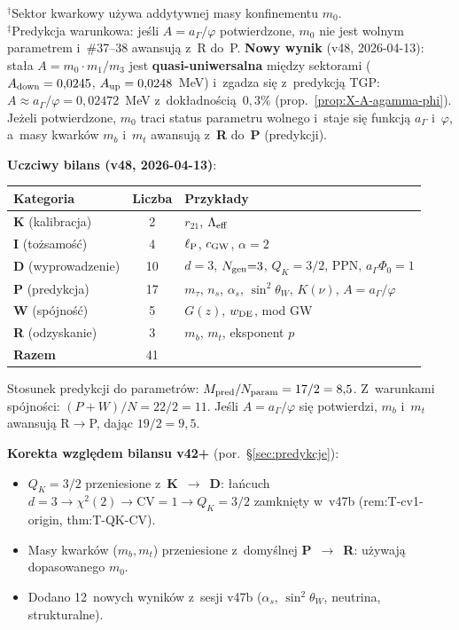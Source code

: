 \smallskip\noindent
$^\dagger$Sektor kwarkowy u\.zywa addytywnej masy konfinementu $m_0$.\\
$^\ddagger$Predykcja warunkowa: je\'sli $A = a_\Gamma/\varphi$ potwierdzone,
$m_0$ nie jest wolnym parametrem i~\#37--38 awansuj\k{a} z~R do~P.
\textbf{Nowy wynik} (v48, 2026-04-13): sta\l{}a $A = m_0 \cdot m_1/m_3$
jest \textbf{quasi-uniwersalna} mi\k{e}dzy sektorami
($A_{\rm down} = 0{,}0245$, $A_{\rm up} = 0{,}0248$~MeV)
i~zgadza si\k{e} z~predykcj\k{a} TGP: $A \approx a_\Gamma/\varphi = 0{,}02472$~MeV
z~dok\l{}adno\'sci\k{a}~$0{,}3\%$ (prop.~\ref{prop:X-A-agamma-phi}).
Je\.zeli potwierdzone, $m_0$ traci status parametru wolnego
i~staje si\k{e} funkcj\k{a} $a_\Gamma$ i~$\varphi$,
a~masy kwark\'ow $m_b$ i~$m_t$ awansuj\k{a} z~\textbf{R}
do~\textbf{P} (predykcji).

\medskip\noindent
\textbf{Uczciwy bilans (v48, 2026-04-13)}:

\begin{center}
\begin{tabular}{@{}lcl@{}}
\toprule
\textbf{Kategoria} & \textbf{Liczba} & \textbf{Przyk\l{}ady} \\
\midrule
\textbf{K} (kalibracja)        & 2  & $r_{21}$, $\Lambda_{\rm eff}$ \\
\textbf{I} (to\.zsamo\'s\'c)   & 4  & $\ell_{\mathrm{P}}$, $c_{\rm GW}$, $\alpha{=}2$ \\
\textbf{D} (wyprowadzenie)     & 10 & $d{=}3$, $N_{\rm gen}{=}3$, $Q_K{=}3/2$, PPN, $a_\Gamma\Phi_0{=}1$ \\
\textbf{P} (predykcja)         & 17 & $m_\tau$, $n_s$, $\alpha_s$, $\sin^2\theta_W$, $K(\nu)$, $A{=}a_\Gamma/\varphi$ \\
\textbf{W} (sp\'ojno\'s\'c)   & 5  & $G(z)$, $w_{\rm DE}$, mod GW \\
\textbf{R} (odzyskanie)        & 3  & $m_b$, $m_t$, eksponent $p$ \\
\midrule
\textbf{Razem}                 & 41 & \\
\bottomrule
\end{tabular}
\end{center}

\noindent
Stosunek predykcji do parametr\'ow: $M_{\rm pred}/N_{\rm param} = 17/2 = 8{,}5$.
Z~warunkami sp\'ojno\'sci: $(P + W)/N = 22/2 = 11$.
Je\'sli $A = a_\Gamma/\varphi$ si\k{e} potwierdzi, $m_b$ i~$m_t$
awansuj\k{a} R$\to$P, daj\k{a}c $19/2 = 9{,}5$.

\medskip\noindent
\textbf{Korekta wzgl\k{e}dem bilansu v42+}
(por.\ \S\ref{sec:predykcje}):
\begin{itemize}\itemsep0pt
  \item $Q_K = 3/2$ przeniesione z~\textbf{K}~$\to$~\textbf{D}:
        \l{}a\'ncuch $d{=}3 \to \chi^2(2) \to \mathrm{CV}{=}1 \to Q_K{=}3/2$
        zamkni\k{e}ty w~v47b (rem:T-cv1-origin, thm:T-QK-CV).
  \item Masy kwark\'ow ($m_b, m_t$) przeniesione z~domy\'slnej
        \textbf{P}~$\to$~\textbf{R}: u\.zywaj\k{a} dopasowanego $m_0$.
  \item Dodano 12~nowych wynik\'ow z~sesji v47b
        ($\alpha_s$, $\sin^2\theta_W$, neutrina, strukturalne).
\end{itemize}

